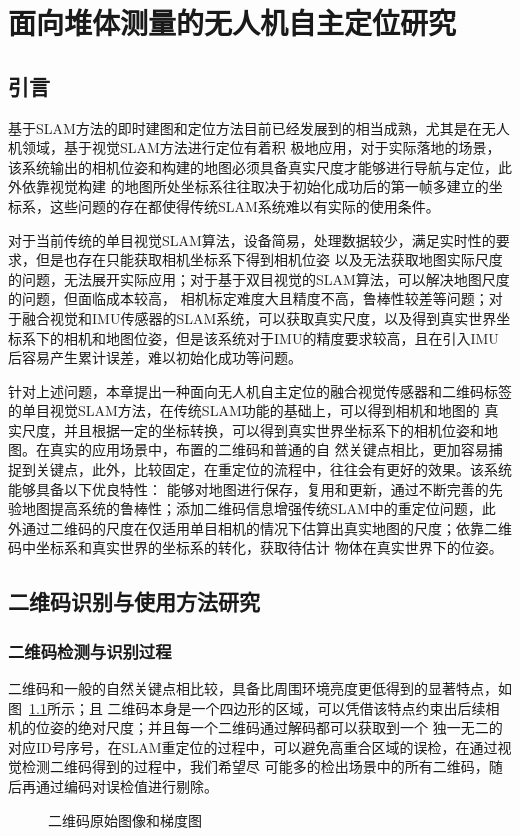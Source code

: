 \chapter{面向堆体测量的无人机自主定位研究}
\label{cha:chap2}
\section{引言}
\label{sec:2.1}
基于SLAM方法的即时建图和定位方法目前已经发展到的相当成熟，尤其是在无人机领域，基于视觉SLAM方法进行定位有着积
极地应用，对于实际落地的场景，该系统输出的相机位姿和构建的地图必须具备真实尺度才能够进行导航与定位，此外依靠视觉构建
的地图所处坐标系往往取决于初始化成功后的第一帧多建立的坐标系，这些问题的存在都使得传统SLAM系统难以有实际的使用条件。

对于当前传统的单目视觉SLAM算法，设备简易，处理数据较少，满足实时性的要求，但是也存在只能获取相机坐标系下得到相机位姿
以及无法获取地图实际尺度的问题，无法展开实际应用；对于基于双目视觉的SLAM算法，可以解决地图尺度的问题，但面临成本较高，
相机标定难度大且精度不高，鲁棒性较差等问题；对于融合视觉和IMU传感器的SLAM系统，可以获取真实尺度，以及得到真实世界坐
标系下的相机和地图位姿，但是该系统对于IMU的精度要求较高，且在引入IMU后容易产生累计误差，难以初始化成功等问题。

针对上述问题，本章提出一种面向无人机自主定位的融合视觉传感器和二维码标签的单目视觉SLAM方法，在传统SLAM功能的基础上，可以得到相机和地图的
真实尺度，并且根据一定的坐标转换，可以得到真实世界坐标系下的相机位姿和地图。在真实的应用场景中，布置的二维码和普通的自
然关键点相比，更加容易捕捉到关键点，此外，比较固定，在重定位的流程中，往往会有更好的效果。该系统能够具备以下优良特性：
能够对地图进行保存，复用和更新，通过不断完善的先验地图提高系统的鲁棒性；添加二维码信息增强传统SLAM中的重定位问题，此
外通过二维码的尺度在仅适用单目相机的情况下估算出真实地图的尺度；依靠二维码中坐标系和真实世界的坐标系的转化，获取待估计
物体在真实世界下的位姿。
\section{二维码识别与使用方法研究}
\label{sec:2.2}
\subsection{二维码检测与识别过程}
\label{sec:2.2.1}
二维码和一般的自然关键点相比较，具备比周围环境亮度更低得到的显著特点，如图~\ref{fig:Aruco_Aruco_Gradient}所示；且
二维码本身是一个四边形的区域，可以凭借该特点约束出后续相机的位姿的绝对尺度；并且每一个二维码通过解码都可以获取到一个
独一无二的对应ID号序号，在SLAM重定位的过程中，可以避免高重合区域的误检，在通过视觉检测二维码得到的过程中，我们希望尽
可能多的检出场景中的所有二维码，随后再通过编码对误检值进行剔除。
\begin{figure}[H]
  \centering%
  \hspace{4em}%
  \caption{二维码原始图像和梯度图}
  \label{fig:Aruco_Aruco_Gradient}
\end{figure}

